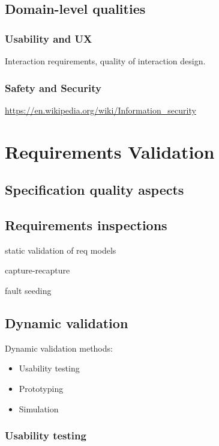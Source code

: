 \documentclass{reqengbook}
\begin{document}
\section{Domain-level qualities}

\subsection{Usability and UX}

Interaction requirements, quality of interaction design.

\subsection{Safety and Security}

\url{https://en.wikipedia.org/wiki/Information_security}

\chapter{Requirements Validation}

\section{Specification quality aspects}


\section{Requirements inspections}
static validation of req models

capture-recapture

fault seeding

\section{Dynamic validation}

Dynamic validation methods:
\begin{itemize}
  \item Usability testing
  \item Prototyping
  \item Simulation
\end{itemize}

\subsection{Usability testing}
\end{document}
